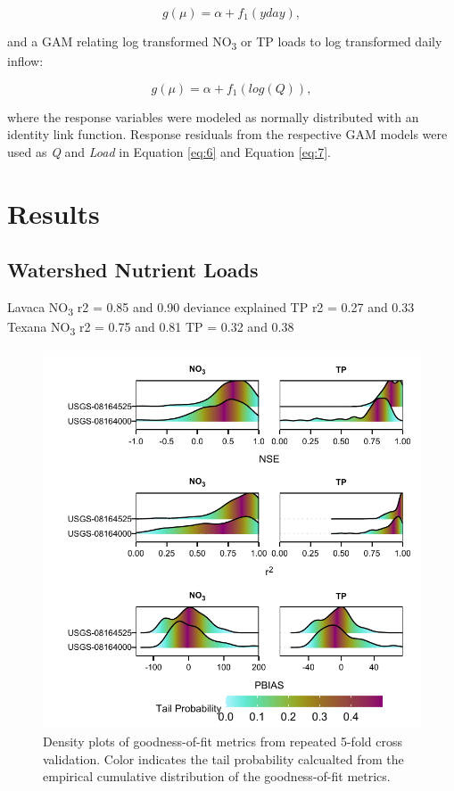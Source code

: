 \documentclass[water,article,submit,oneauthor]{Definitions/mdpi}
\begin{document}
\begin{equation}\label{eq:8}
g(\mu) = \alpha + f_1(yday),
\end{equation}

and a GAM relating log transformed NO\textsubscript{3} or TP loads to
log transformed daily inflow:

\begin{equation}\label{eq:9}
g(\mu) = \alpha + f_1(log(Q)),
\end{equation}

where the response variables were modeled as normally distributed with
an identity link function. Response residuals from the respective GAM
models were used as \emph{Q} and \emph{Load} in Equation \ref{eq:6} and
Equation \ref{eq:7}.

\hypertarget{results}{%
\section{Results}\label{results}}

\hypertarget{watershed-nutrient-loads}{%
\subsection{Watershed Nutrient Loads}\label{watershed-nutrient-loads}}

Lavaca NO\textsubscript{3} r2 = 0.85 and 0.90 deviance explained TP r2 =
0.27 and 0.33 Texana NO\textsubscript{3} r2 = 0.75 and 0.81 TP = 0.32
and 0.38

\begin{figure}
\centering
\includegraphics{Schramm-Manuscript-2023_files/figure-latex/fig2-1.pdf}
\caption{Density plots of goodness-of-fit metrics from repeated 5-fold
cross validation. Color indicates the tail probability calcualted from
the empirical cumulative distribution of the goodness-of-fit metrics.}
\end{figure}
\end{document}
